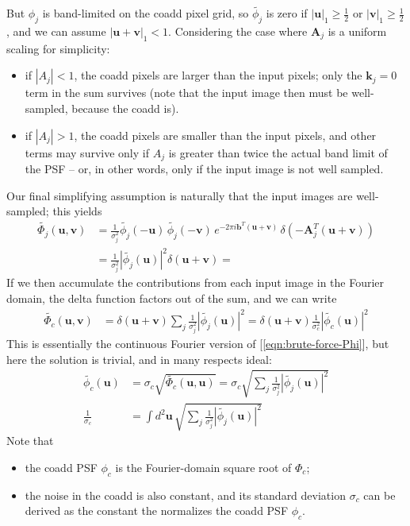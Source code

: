 \documentclass[DM,authoryear,toc]{lsstdoc}
\begin{document}
But $\phi_j$ is band-limited on the coadd pixel grid, so $\widetilde{\phi_j}$ is zero if $|\symbf{u}|_1 \ge \frac{1}{2}$ or $|\symbf{v}|_1 \ge \frac{1}{2}$, and we can assume $|\symbf{u} + \symbf{v}|_1 < 1$.
Considering the case where $\symbf{A}_j$ is a uniform scaling for simplicity:
\begin{itemize}
    \item if $|A_j| < 1$, the coadd pixels are larger than the input pixels; only the $\symbf{k}_j = 0$ term in the sum survives (note that the input image then must be well-sampled, because the coadd is).
    \item if $|A_j| > 1$, the coadd pixels are smaller than the input pixels, and other terms may survive only if $A_j$ is greater than twice the actual band limit of the PSF -- or, in other words, only if the input image is not well sampled.
\end{itemize}

Our final simplifying assumption is naturally that the input images are well-sampled; this yields
\begin{align}
    \widetilde{\Phi_j}(\symbf{u}, \symbf{v}) &= \frac{1}{\sigma_j^2}
        \widetilde{\phi_j}(-\symbf{u}) \, \widetilde{\phi_j}(-\symbf{v}) \,
        e^{-2\pi i \symbf{b}^T(\symbf{u}+\symbf{v})} \,
        \delta\left(-\symbf{A}_j^T (\symbf{u} + \symbf{v}) \right) \\
    &= \frac{1}{\sigma_j^2}
        \left|\widetilde{\phi_j}(\symbf{u})\right|^2
        \delta(\symbf{u} + \symbf{v})
    =
\end{align}
If we then accumulate the contributions from each input image in the Fourier domain, the delta function factors out of the sum, and we can write
\begin{align}
    \widetilde{\Phi_c}(\symbf{u}, \symbf{v})
        &= \delta(\symbf{u} + \symbf{v})
            \sum_j \frac{1}{\sigma_j^2} \left|\widetilde{\phi_j}(\symbf{u})\right|^2
        = \delta(\symbf{u} + \symbf{v})
            \frac{1}{\sigma_c^2} \left|\widetilde{\phi_c}(\symbf{u})\right|^2
\end{align}
This is essentially the continuous Fourier version of [\ref{eqn:brute-force-Phi}], but here the solution is trivial, and in many respects ideal:
\begin{align}
    \widetilde{\phi_c}(\symbf{u}) &= \sigma_c \sqrt{\widetilde{\Phi_c}(\symbf{u}, \symbf{u})}
        = \sigma_c \sqrt{\sum_j \frac{1}{\sigma_j^2} \left|\widetilde{\phi_j}(\symbf{u})\right|^2} \\
    \frac{1}{\sigma_c} &= \int\!\!d^2\symbf{u} \, \sqrt{\sum_j \frac{1}{\sigma_j^2} \left|\widetilde{\phi_j}(\symbf{u})\right|^2}
\end{align}
Note that
\begin{itemize}
    \item the coadd PSF $\phi_c$ is the Fourier-domain square root of $\Phi_c$;
    \item the noise in the coadd is also constant, and its standard deviation $\sigma_c$ can be derived as the constant the normalizes the coadd PSF $\phi_c$.
\end{itemize}
\end{document}
